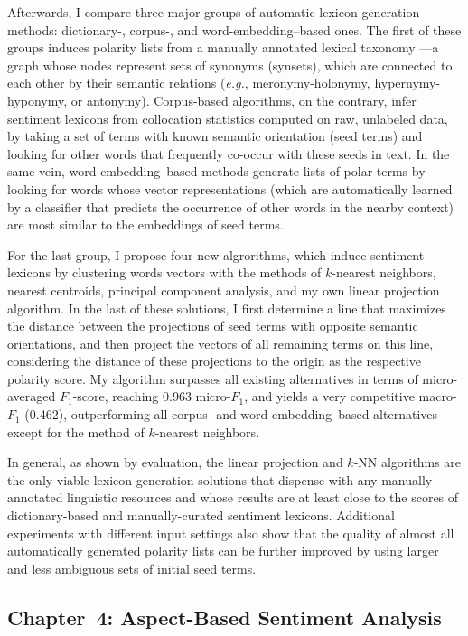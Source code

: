 \documentclass[11pt]{article}
\newcommand{\eg}{\textit{e.g.},}
\newcommand{\F}[0]{$F_1$}
\renewcommand{\cite}{\citep}
\begin{document}
Afterwards, I compare three major groups of automatic
lexicon-generation methods: dictionary-, corpus-, and
word-embedding--based ones.  The first of these groups induces
polarity lists from a manually annotated lexical taxonomy
\cite[\textsc{GermaNet}; ][]{Hamp:97}---a graph whose nodes represent
sets of synonyms (synsets), which are connected to each other by their
semantic relations (\eg{} meronymy-holonymy, hypernymy-hyponymy, or
antonymy).  Corpus-based algorithms, on the contrary, infer sentiment
lexicons from collocation statistics computed on raw, unlabeled data,
by taking a set of terms with known semantic orientation (seed terms)
and looking for other words that frequently co-occur with these seeds
in text.  In the same vein, word-embedding--based methods generate
lists of polar terms by looking for words whose vector representations
(which are automatically learned by a classifier that predicts the
occurrence of other words in the nearby context) are most similar to
the embeddings of seed terms.

For the last group, I propose four new algrorithms, which induce
sentiment lexicons by clustering words vectors with the methods of
$k$-nearest neighbors, nearest centroids, principal component
analysis, and my own linear projection algorithm.  In the last of
these solutions, I first determine a line that maximizes the distance
between the projections of seed terms with opposite semantic
orientations, and then project the vectors of all remaining terms on
this line, considering the distance of these projections to the origin
as the respective polarity score.  My algorithm surpasses all existing
alternatives in terms of micro-averaged \F{}-score, reaching 0.963
micro-\F{}, and yields a very competitive macro-\F{} (0.462),
outperforming all corpus- and word-embedding--based alternatives
except for the method of $k$-nearest neighbors.

In general, as shown by evaluation, the linear projection and $k$-NN
algorithms are the only viable lexicon-generation solutions that
dispense with any manually annotated linguistic resources and whose
results are at least close to the scores of dictionary-based and
manually-curated sentiment lexicons.  Additional experiments with
different input settings also show that the quality of almost all
automatically generated polarity lists can be further improved by
using larger and less ambiguous sets of initial seed terms.

\subsection{Chapter~4: Aspect-Based Sentiment Analysis}
\end{document}
